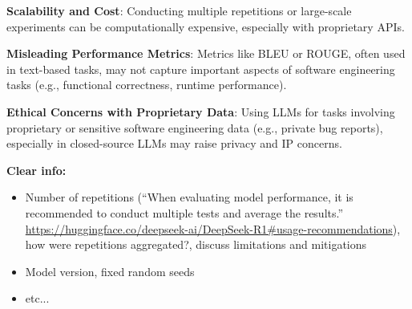 \textbf{Scalability and Cost}:
Conducting multiple repetitions or large-scale experiments can be computationally expensive, especially with proprietary APIs.

\textbf{Misleading Performance Metrics}:
Metrics like BLEU or ROUGE, often used in text-based tasks, may not capture important aspects of software engineering tasks (e.g., functional correctness, runtime performance).

\textbf{Ethical Concerns with Proprietary Data}:
Using LLMs for tasks involving proprietary or sensitive software engineering data (e.g., private bug reports), especially in closed-source LLMs may raise privacy and IP concerns.

\textbf{Clear info:} 
\begin{itemize}
  \item Number of repetitions (``When evaluating model performance, it is recommended to conduct multiple tests and average the results.'' \url{https://huggingface.co/deepseek-ai/DeepSeek-R1\#usage-recommendations}), how were repetitions aggregated?, discuss limitations and mitigations
  \item Model version, fixed random seeds
  \item etc...
\end{itemize}






